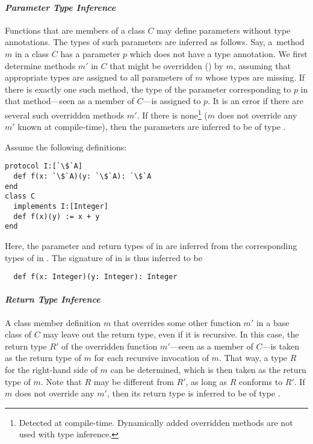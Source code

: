 \paragraph{\em Parameter Type Inference}
Functions that are members of a class $C$ may define parameters without type annotations. The types of such parameters are inferred as follows. Say, a~method $m$ in a class $C$ has a parameter $p$ which does not have a type annotation. We first determine methods $m'$ in $C$ that might be overridden () by $m$, assuming that appropriate types are assigned to all parameters of $m$ whose types are missing. If there is exactly one such method, the type of the parameter corresponding to $p$ in that method---seen as a member of $C$---is assigned to $p$. It is an error if there are several such overridden methods $m'$. If there is none\footnote{Detected at compile-time. Dynamically added overridden methods are not used with type inference.} ($m$ does not override any $m'$ known at compile-time), then the parameters are inferred to be of type .

\example Assume the following definitions:
\begin{lstlisting}[escapechar=`]
protocol I:[`\$`A]
  def f(x: `\$`A)(y: `\$`A): `\$`A
end
class C
  implements I:[Integer]
  def f(x)(y) := x + y
end
\end{lstlisting}
Here, the parameter and return types of \lstinline@f@ in \lstinline@C@ are
inferred from the corresponding types of \lstinline@f@ in \lstinline@I@. The 
signature of \lstinline@f@ in \lstinline@C@ is thus inferred to be
\begin{lstlisting}
  def f(x: Integer)(y: Integer): Integer
\end{lstlisting}

\paragraph{\em Return Type Inference}
A class member definition $m$ that overrides some other function $m'$ in a base class of $C$ may leave out the return type, even if it is recursive. In this case, the return type $R'$ of the overridden function $m'$---seen as a member of $C$---is taken as the return type of $m$ for each recursive invocation of $m$. That way, a type $R$ for the right-hand side of $m$ can be determined, which is then taken as the return type of $m$. Note that $R$ may be different from $R'$, as long as $R$ conforms to $R'$. If $m$ does not override any $m'$, then its return type is inferred to be of type . 

